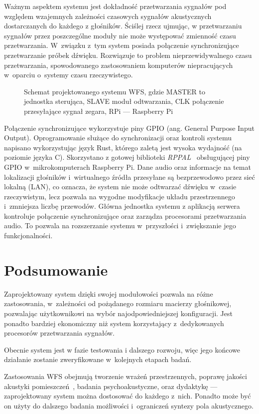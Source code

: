 \documentclass[12pt]{oska}
\let\Oldsection\section
\renewcommand{\section}{\FloatBarrier\Oldsection}
\begin{document}
Ważnym aspektem systemu jest dokładność przetwarzania sygnałów pod względem
wzajemnych zależności czasowych sygnałów akustycznych dostarczanych do każdego
z głośników.  Ściślej rzecz ujmując, w przetwarzaniu sygnałów przez
poszczególne moduły nie może występować zmienność czasu przetwarzania. W~związku
z~tym system posiada połączenie synchronizujące przetwarzanie próbek dźwięku.
Rozwiązuje to problem nieprzewidywalnego czasu przetwarzania, spowodowanego zastosowaniem komputerów niepracujących w~oparciu o~systemy czasu rzeczywistego.

\begin{figure}[H]
  \centering
  \caption{Schemat projektowanego systemu WFS, gdzie MASTER to jednostka sterująca, SLAVE moduł odtwarzania, CLK połączenie przesyłające sygnał zegara, RPi --- Raspberry Pi}
  \label{fig:schemat}
\end{figure}

Połączenie synchronizujące wykorzystuje piny GPIO (ang. General Purpose Input Output). Oprogramowanie służące do
synchronizacji oraz kontroli systemu napisano wykorzystując język Rust, którego
zaletą jest wysoka wydajność (na poziomie języka C). Skorzystano z gotowej
biblioteki \emph{RPPAL}~\cite{RPPAL} obsługującej piny GPIO w~mikrokomputerach
Raspberry Pi. Dane audio oraz informacje na temat lokalizacji głośników i~wirtualnego źródła przesyłane są bezprzewodowo przez sieć lokalną (LAN), co
oznacza, że system nie może odtwarzać dźwięku w~czasie rzeczywistym, lecz
pozwala na wygodne modyfikacje układu przestrzennego i~zmniejsza liczbę
przewodów. Główna jednostka systemu z aplikacją serwera kontroluje połączenie
synchronizujące oraz zarządza procesorami przetwarzania audio. To pozwala na rozszerzanie
systemu w~przyszłości i~zwiększanie jego funkcjonalności.

\section{Podsumowanie}

Zaprojektowany system dzięki swojej modułowości pozwala na różne zastosowania, w~zależności od pożądanego rozmiaru macierzy głośnikowej,
pozwalając użytkownikowi na wybór najodpowiedniejszej konfiguracji. Jest
ponadto bardziej ekonomiczny niż system korzystający z~dedykowanych procesorów
przetwarzania sygnałów.

Obecnie system jest w fazie testowania i dalszego rozwoju, więc jego końcowe
działanie zostanie zweryfikowane w~kolejnych etapach badań.

Zastosowania WFS obejmują tworzenie wrażeń przestrzennych, poprawę
jakości akustyki pomieszczeń~\cite{enhancement}, badania psychoakustyczne,
oraz dydaktykę --- zaprojektowany system można dostosować do każdego z~nich.
Ponadto może być on użyty do dalszego badania możliwości i~ograniczeń syntezy
pola akustycznego.

\printbibliography
\end{document}
